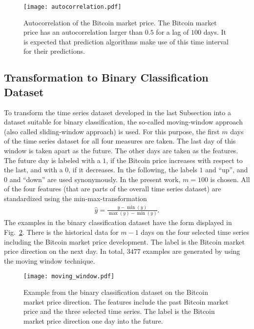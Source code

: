 \begin{figure}[h!]
	\centering
	\texttt{[image: autocorrelation.pdf]}
    \caption{Autocorrelation of the Bitcoin market price. The Bitcoin market price has an autocorrelation larger than $0.5$ for a lag of $100$ days. It is expected that prediction algorithms make use of this time interval for their predictions.}
    \label{fig:autocorrelation}
\end{figure}

\clearpage

\subsection{Transformation to Binary Classification Dataset}
To transform the time series dataset developed in the last Subsection into a dataset suitable for binary classification, the so-called moving-window approach (also called sliding-window approach) is used. For this purpose, the first $m$ days of the time series dataset for all four measures are taken. The last day of this window is taken apart as the future. The other days are taken as the features. The future day is labeled with a $1$, if the Bitcoin price increases with respect to the last, and with a $0$, if it decreases. In the following, the labels $1$ and \enquote{up}, and $0$ and \enquote{down} are used synonymously. In the present work, $m = 100$ is chosen. All of the four features (that are parts of the overall time series dataset) are standardized using the min-max-transformation
\begin{align*}
	\hat{y} = \frac{y - \min(y)}{\max(y) - \min(y)}.
\end{align*}
The examples in the binary classification dataset have the form displayed in Fig.~\ref{fig:example}. There is the historical data for $m-1$ days on the four selected time series including the Bitcoin market price development. The label is the Bitcoin market price direction on the next day. In total, $3477$ examples are generated by using the moving window technique.

\begin{figure}
	\centering
	\texttt{[image: moving\_window.pdf]}
    \caption{Example from the binary classification dataset on the Bitcoin market price direction. The features include the past Bitcoin market price and the three selected time series. The label is the Bitcoin market price direction one day into the future.}
    \label{fig:example}
\end{figure}


